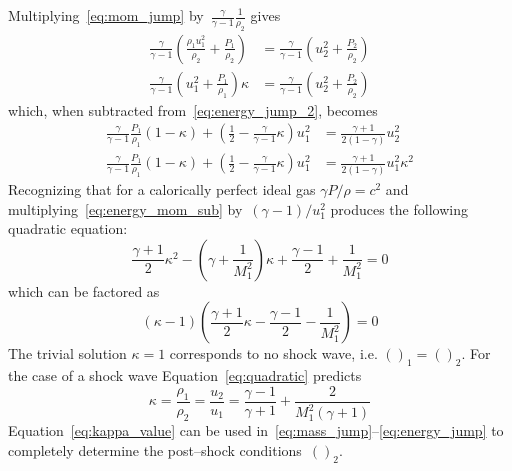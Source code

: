 Multiplying~\eqref{eq:mom_jump} by~$\frac{\gamma}{\gamma-1}\frac{1}{\rho_2}$ gives
\begin{align}
  \nonumber
  \frac{\gamma}{\gamma - 1}\left(\frac{\rho_1 u_1^2}{\rho_2} + \frac{P_1}{\rho_2}\right) &=
  \frac{\gamma}{\gamma - 1}\left(u_2^2 + \frac{P_2}{\rho_2}\right) \\
  \nonumber
  \frac{\gamma}{\gamma - 1}\left(u_1^2 + \frac{P_1}{\rho_1}\right)\kappa &=
  \frac{\gamma}{\gamma - 1}\left(u_2^2 + \frac{P_2}{\rho_2}\right)
\end{align}
which, when subtracted from~\eqref{eq:energy_jump_2}, becomes
\begin{align}
  \nonumber
  \frac{\gamma}{\gamma - 1}\frac{P_1}{\rho_1}\left(1-\kappa\right) +
    \left(\frac{1}{2} - \frac{\gamma}{\gamma - 1}\kappa\right)u_1^2 &=
    \frac{\gamma + 1}{2\left(1-\gamma\right)}u_2^2 \\
    \label{eq:energy_mom_sub}
  \frac{\gamma}{\gamma - 1}\frac{P_1}{\rho_1}\left(1-\kappa\right) +
    \left(\frac{1}{2} - \frac{\gamma}{\gamma - 1}\kappa\right)u_1^2 &=
    \frac{\gamma + 1}{2\left(1-\gamma\right)}u_1^2\kappa^2 
\end{align}
Recognizing that for a calorically perfect ideal gas $\gamma P/\rho=c^2$ and multiplying~\eqref{eq:energy_mom_sub} by~$\left(\gamma - 1\right)/u_1^2$ produces the following quadratic equation:
\begin{equation}
  \nonumber
  \frac{\gamma + 1}{2} \kappa^2 - \left(\gamma + \frac{1}{M_1^2}\right)\kappa +
    \frac{\gamma-1}{2} + \frac{1}{M_1^2} = 0
\end{equation}
which can be factored as
\begin{equation}
  \label{eq:quadratic}
  \left(\kappa - 1\right)\left(\frac{\gamma + 1}{2}\kappa - \frac{\gamma-1}{2} - \frac{1}{M_1^2}\right) = 0
\end{equation}
The trivial solution $\kappa=1$ corresponds to no shock wave, i.e. $()_1=()_2$.  For the case of a shock wave Equation~\eqref{eq:quadratic} predicts
\begin{equation}
  \label{eq:kappa_value}
  \kappa = \frac{\rho_1}{\rho_2} = \frac{u_2}{u_1} = \frac{\gamma-1}{\gamma+1} + \frac{2}{M_1^2\left(\gamma+1\right)}
\end{equation}
Equation~\eqref{eq:kappa_value} can be used in~\eqref{eq:mass_jump}--\eqref{eq:energy_jump} to completely determine the post--shock conditions~$()_2$.



